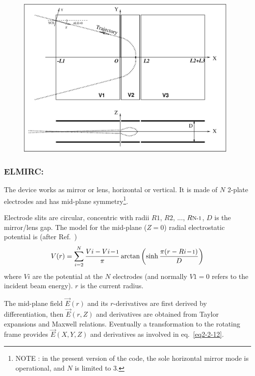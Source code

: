 \begin{figure}[H]
\centerline{\includegraphics[height=8cm]{FigELMIR.eps}}
\hangcaption{\label{figELMIR} \CapELMIR}
\end{figure}

\vfill

\newpage

\subsubsection*{ELMIRC: \ELMIRCTitl~\cite{Karets}}\label{ELMIRC}
\medskip

The device works as  mirror or lens, horizontal or vertical. 
It is made of $N$ 2-plate electrodes and has mid-plane 
symmetry\footnote{NOTE : in the present version of the code, the sole horizontal mirror mode 
 is operational, and $N$ is limited to 3.}. 
\bigskip

\noindent Electrode  slits are circular, concentric with  radii  $ R1 $, $ R2 $, ...,   
$ R{\textrm{\footnotesize N-1}}$, 
$D$ is the  mirror/lens gap. The model for the mid-plane ($Z=0$) radial electrostatic potential  
is (after Ref.~\cite[p.443]{Karets})
$$ V(r) = 
   \sum_{i=2}^{N} \dfrac{V{i}-V{i\!-\!\textrm{\footnotesize 1}} }{ \pi} 
     \arctan \left( \sinh \dfrac{ \pi ( r - R{i\!-\!\textrm{\footnotesize 1}})}{D} \right)  
$$
where $V\!i$ are the potential at the $N$ electrodes (and normally $V\!1=0$ refers to
the incident beam energy). $r$ is the current radius. 

 The mid-plane field $ \vec  E(r) $ and its $r$-derivatives are first derived by differentiation, then 
$ \vec  E(r,Z) $ and  derivatives are obtained from Taylor expansions and Maxwell relations. 
Eventually a transformation to the rotating frame provides $\vec  E(X,Y,Z)$ 
 and  derivatives as involved in eq.~\ref{eq2-2-12}. 


